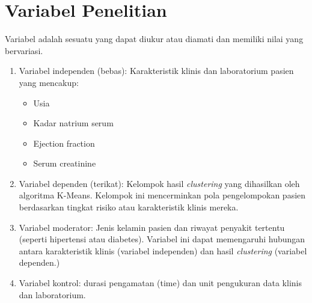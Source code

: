 \documentclass[english,12pt,a4paper,openany]{book}
\begin{document}
	\section{Variabel Penelitian}
	Variabel adalah sesuatu yang dapat diukur atau diamati dan memiliki nilai yang bervariasi.
	\begin{enumerate}
		\item Variabel independen (bebas): Karakteristik klinis dan laboratorium pasien yang mencakup:
		\begin{itemize}
			\item Usia
			\item Kadar natrium serum
			\item Ejection fraction
			\item Serum creatinine
		\end{itemize}
		\item Variabel dependen (terikat): Kelompok hasil \textit{clustering} yang dihasilkan oleh algoritma K-Means. Kelompok ini mencerminkan pola pengelompokan pasien berdasarkan tingkat risiko atau karakteristik klinis mereka.
		\item Variabel moderator: Jenis kelamin pasien dan riwayat penyakit tertentu (seperti hipertensi atau diabetes). Variabel ini dapat memengaruhi hubungan antara karakteristik klinis (variabel independen) dan hasil \textit{clustering} (variabel dependen.)
		\item Variabel kontrol: durasi pengamatan (time) dan unit pengukuran data klinis dan laboratorium.
	\end{enumerate}
\end{document}

